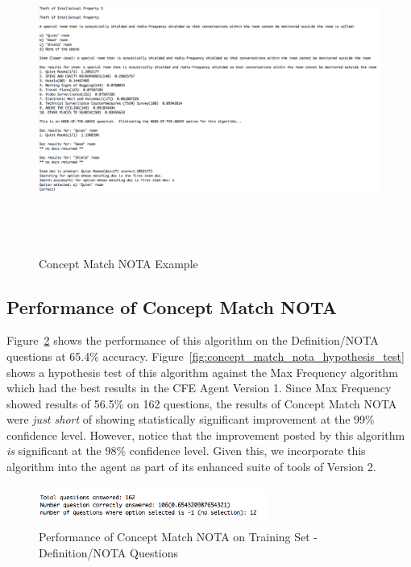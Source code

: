 \begin{figure}
\centering
\vspace{0.75in}
\includegraphics[width=125mm, height=100mm]{concept_match_nota_example.png}
\caption{Concept Match NOTA Example}
\label{fig:concept_match_nota_example}
\end{figure}

\subsection{Performance of Concept Match NOTA}

Figure~\ref{fig:concept_match_nota_training_set_performance} shows the performance of this algorithm on the Definition/NOTA questions at 65.4\% accuracy.  Figure~\ref{fig:concept_match_nota_hypothesis_test} shows a hypothesis test of this algorithm against the Max Frequency algorithm which had the best results in the CFE Agent Version 1.  Since Max Frequency showed results of 56.5\% on 162 questions, the results of Concept Match NOTA were \emph{just short} of showing statistically significant improvement at the 99\% confidence level.  However, notice that the improvement posted by this algorithm \emph{is} significant at the 98\% confidence level.  Given this, we incorporate this algorithm into the agent as part of its enhanced suite of tools of Version 2.

\begin{figure}
\centering
\vspace{0.75in}
\includegraphics[width=75mm, height=13mm]{concept_match_nota_training_set_performance.png}
\caption{Performance of Concept Match NOTA on Training Set - Definition/NOTA Questions}
\label{fig:concept_match_nota_training_set_performance}
\end{figure}



